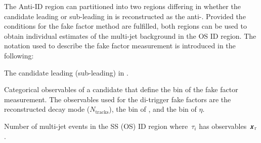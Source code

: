 {%
  \newcommand*{\ffargs}{\ensuremath{( \myvec{x}_{\tau} )}\xspace}

  \newcommand*{\NmjID}[2]{\ensuremath{N_\text{multi-jet}^{\text{#1, loose }\tau_{#2}}}\xspace}
  \newcommand*{\NmjIDIncl}[1]{\ensuremath{N_\text{multi-jet}^{\text{#1, ID}}}\xspace}

  \newcommand*{\NmjAntiIDIncl}[1]{\ensuremath{N_\text{multi-jet}^{\text{#1, Anti-ID}}}\xspace}
  \newcommand*{\NmjAntiID}[2]{\ensuremath{N_\text{multi-jet}^{\text{#1, anti-}\tau_{#2}}}\xspace}

  The Anti-ID region can partitioned into two regions differing in
  whether the \tauhadvis candidate leading or sub-leading in \pT is
  reconstructed as the anti-\tauhadvis. Provided the conditions for
  the fake factor method are fulfilled, both regions can be used to
  obtain individual estimates of the multi-jet background in the OS ID
  region. The notation used to describe the fake factor measurement is
  introduced in the following:
  \begin{description}[style=standard]
  \item[$\tau_0$ ($\tau_1$)] The \tauhadvis candidate leading (sub-leading) in \pT.

  \item[$\myvec{x}_\tau$] Categorical observables of a \tauhadvis
    candidate that define the bin of the fake factor measurement. The
    observables used for the di-\tauhadvis trigger fake factors are
    the reconstructed decay mode ($N_\text{tracks}$), the bin of
    \tauhadvis \pT, and the bin of \tauhadvis $\eta$.

  \item[$\NmjID{SS(OS)}{i}\ffargs$] Number of multi-jet events in the
    SS (OS) ID region where~$\tau_i$ has
    observables~$\myvec{x}_\tau$. 


\end{description}}
